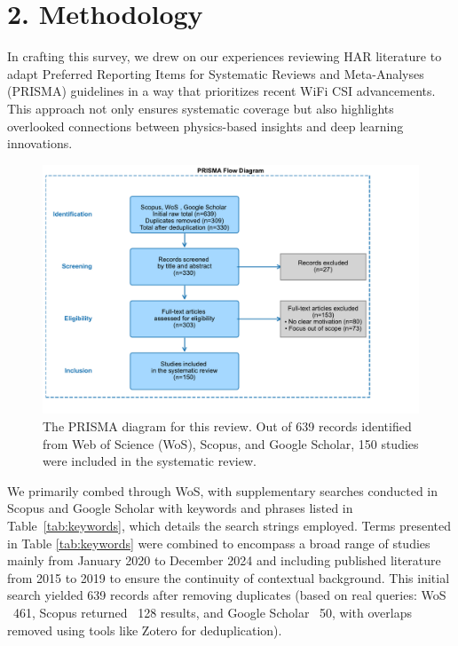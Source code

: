 \documentclass[Afour,sageh,times]{sagej}
\begin{document}

\section{2. Methodology}

In crafting this survey, we drew on our experiences reviewing HAR literature to adapt Preferred Reporting Items for Systematic Reviews and Meta-Analyses (PRISMA) guidelines \citep{page2021prisma}  in a way that prioritizes recent WiFi CSI advancements.  This approach not only ensures systematic coverage but also highlights overlooked connections between physics-based insights and deep learning innovations.

\begin{figure}[htbp]
\centering
\includegraphics[width=1\linewidth]{3.prisma_output.pdf}
\caption{The PRISMA diagram for this review. Out of 639 records identified from Web of Science (WoS), Scopus, and Google Scholar, 150 studies were included in the systematic review.}
\label{fig:prisma}
\end{figure}

We primarily combed through WoS, with supplementary searches conducted in Scopus and Google Scholar with keywords and phrases listed in Table~\ref{tab:keywords}, which details the search strings employed. Terms presented in Table \ref{tab:keywords} were combined to encompass a broad range of studies mainly from January 2020 to December 2024 and including published literature from 2015 to 2019 to ensure the continuity of contextual background. This initial search yielded 639 records after removing duplicates (based on real queries: WoS ~461, Scopus returned ~128 results, and Google Scholar ~50, with overlaps removed using tools like Zotero for deduplication).
\end{document}
